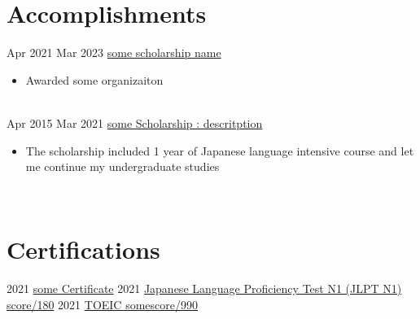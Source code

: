 \documentclass[letterpaper]{DS_class_file} %
\begin{document}
\section{Accomplishments}

\begin{twenty} %
	\twentyitem
	{Apr 2021}
	{Mar 2023}
	{\hspace{0.3cm}\href{https://www.es.osaka-u.ac.jp/en/index.html}{some scholarship name }}
	{}
	{}
	{
		{\begin{itemize}
				\item Awarded some organizaiton 
		\end{itemize}}
	}
	\\

	\twentyitem
	{Apr 2015}
	{Mar 2021}
	{\hspace{0.3cm}\href{https://www.es.osaka-u.ac.jp/en/index.html}{some Scholarship : descritption}}
	{}
	{}
	{
		{\begin{itemize}
		\item The scholarship included 1 year of Japanese language intensive course and let me continue my undergraduate studies 
	
		\end{itemize}}
}
	\\
	
\end{twenty}

\section{Certifications}

\begin{twenty} %
    \twentyitem
	{2021}
	{}
	{\hspace{0.3cm}\href{https://www.es.osaka-u.ac.jp/en/index.html}{some Certificate}}
	{}
	{}
	{}
	\twentyitem
	{2021}
	{}
	{\hspace{0.3cm}\href{https://www.es.osaka-u.ac.jp/en/index.html}{Japanese Language Proficiency Test N1 (JLPT N1) score/180}}
	{}
	{}
	{}
	\twentyitem
	{2021}
	{}
	{\hspace{0.3cm}\href{https://www.es.osaka-u.ac.jp/en/index.html}{TOEIC somescore/990}}
	{}
	{}
	{}
\end{twenty}
\let\clearpage\relax
\end{document}
